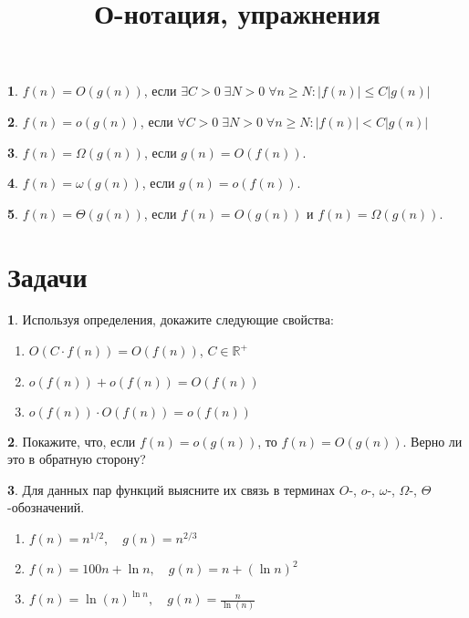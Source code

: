 \documentclass[10pt, oneside]{article}
\title{О-нотация, упражнения}
\theoremstyle{definition}
\newtheorem{problem}{}
\newtheorem{definition}{}
\begin{document}
\maketitle

\begin{definition}
$f(n) = O(g(n))$, если
$\exists C > 0 \; \exists N > 0 \; \forall n \geqslant N : |f(n)| \leqslant C |g(n)|$
\end{definition}

\begin{definition}
$f(n) = o(g(n))$, если
$\forall C > 0 \; \exists N > 0 \; \forall n \geqslant N : |f(n)| < C |g(n)|$
\end{definition}

\begin{definition}
$f(n) = \Omega(g(n))$, если $g(n) = O(f(n))$.
\end{definition}


\begin{definition}
$f(n) = \omega(g(n))$, если $g(n) = o(f(n))$.
\end{definition}

\begin{definition}
$f(n) = \Theta(g(n))$, если $f(n) = O(g(n))$ и $f(n) = \Omega(g(n))$.
\end{definition}


\section{Задачи}

\begin{problem}
Используя определения, докажите следующие свойства:
    \begin{enumerate}
        \item $O(C \cdot f(n)) = O (f(n))$, $C \in \mathbb{R}^{+}$
        \item $o(f(n)) + o(f(n)) = O(f(n))$
        \item $o(f(n)) \cdot O(f(n)) = o(f(n))$
    \end{enumerate}
\end{problem}

\begin{problem}
Покажите, что, если $f(n) = o(g(n))$, то $f(n) = O(g(n))$. Верно ли это в обратную сторону?
\end{problem}

\begin{problem}
Для данных пар функций выясните их связь в терминах
$O$-, $o$-, $\omega$-, $\Omega$-, $\Theta$-обозначений.
\begin{enumerate}
    \item $f(n) = n^{1/2}, \quad g(n) = n^{2/3}$
    \item $f(n) = 100n + \ln n, \quad g(n) = n + (\ln n)^2$
    \item $f(n) = \ln(n)^{\ln n}, \quad g(n) = \frac{n}{\ln(n)}$
\end{enumerate}
\end{problem}
\end{document}
